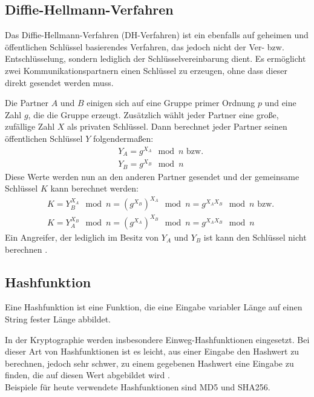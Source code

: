\subsection{Diffie-Hellmann-Verfahren}

\label{sec_diffie_hellman}

Das Diffie-Hellmann-Verfahren (DH-Verfahren) ist ein ebenfalls auf geheimen und öffentlichen Schlüssel basierendes Verfahren, das jedoch nicht der Ver- bzw. Entschlüsselung, sondern lediglich der Schlüsselvereinbarung dient. Es ermöglicht zwei Kommunikationspartnern einen Schlüssel zu erzeugen, ohne dass dieser direkt gesendet werden muss. 

Die Partner \(A\) und \(B\) einigen sich auf eine Gruppe primer Ordnung \(p\) und eine Zahl \(g\), die die Gruppe erzeugt. Zusätzlich wählt jeder Partner eine große, zufällige Zahl \(X\) als privaten Schlüssel. Dann berechnet jeder Partner seinen öffentlichen Schlüssel \(Y\) folgendermaßen:
\begin{align*}
&Y_A = g^{X_A} \mod{n} \text{ bzw.}\\
&Y_B = g^{X_B} \mod{n}
\end{align*}
Diese Werte werden nun an den anderen Partner gesendet und der gemeinsame Schlüssel \(K\) kann berechnet werden:
\begin{align*}
&K = Y_B^{X_A} \mod{n} = (g^{X_B})^{X_A }\mod{n} = g^{X_A X_B}\mod{n} \text{ bzw.}\\
&K = Y_A^{X_B} \mod{n} = (g^{X_A})^{X_B }\mod{n} = g^{X_A X_B}\mod{n} 
\end{align*}
Ein Angreifer, der lediglich im Besitz von \(Y_A\) und \(Y_B\) ist kann den Schlüssel nicht berechnen \cite{Schneier2006}. 

\subsection{Hashfunktion}

Eine Hashfunktion ist eine Funktion, die eine Eingabe variabler Länge auf einen String fester Länge abbildet.

In der Kryptographie werden insbesondere Einweg-Hashfunktionen eingesetzt. Bei dieser Art von Hashfunktionen ist es leicht, aus einer Eingabe den Hashwert zu berechnen, jedoch sehr schwer, zu einem gegebenen Hashwert eine Eingabe zu finden, die auf diesen Wert abgebildet wird \cite{Schneier2006}. \\Beispiele für heute verwendete Hashfunktionen sind MD5 und SHA256.

